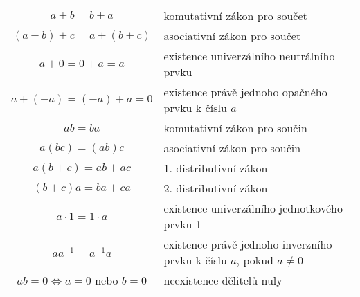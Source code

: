 \documentclass{scrbook}
\begin{document}
  \begin{table}[ht!]
    \centering
    \begin{tabular}{c|L{6cm}}
    \toprule
      \(a + b = b + a\)            & komutativní zákon pro součet  \\ %
      \((a + b) + c = a + (b +c)\) & asociativní zákon pro součet  \\
      \(a + 0 = 0 + a = a\)        & existence univerzálního neutrálního prvku \\
      \(a + (-a) = (-a) + a = 0\)  & existence právě jednoho opačného prvku k číslu \(a\)   \\ 
      \(ab = ba\)                  & komutativní zákon pro součin \\
      \(a(bc) = (ab)c\)            & asociativní zákon pro součin \\
      \(a(b + c) = ab + ac\)       & 1. distributivní zákon  \\
      \((b + c)a =  ba + ca\)      & 2. distributivní zákon \\
      \(a \cdot 1 = 1 \cdot a\)    & existence univerzálního jednotkového prvku 1 \\
      \(aa^{-1} = a^{-1}a\)        & existence právě jednoho inverzního prvku k číslu \(a\),  
                                     pokud \(a\neq 0\)\\
      \(ab = 0 \Leftrightarrow a = 0\) nebo \(b = 0\) & neexistence dělitelů nuly \\
    \bottomrule
    \end{tabular}
  \end{table}
\end{document}

